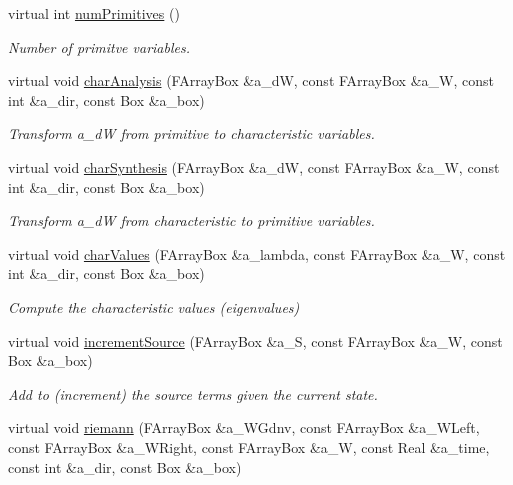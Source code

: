 \begin{DoxyCompactItemize}
virtual int \hyperlink{class_advection_physics_ad00c2d52ec684668ff5cd1da9eed42bf}{num\-Primitives} ()
\begin{DoxyCompactList}\small\item\em Number of primitve variables. \end{DoxyCompactList}\item 
virtual void \hyperlink{class_advection_physics_a63895f9dd1173d14684c0681653c8d36}{char\-Analysis} (F\-Array\-Box \&a\-\_\-d\-W, const F\-Array\-Box \&a\-\_\-\-W, const int \&a\-\_\-dir, const Box \&a\-\_\-box)
\begin{DoxyCompactList}\small\item\em Transform a\-\_\-d\-W from primitive to characteristic variables. \end{DoxyCompactList}\item 
virtual void \hyperlink{class_advection_physics_a8b1269b718057fe2a5d0bc8bdd183d0b}{char\-Synthesis} (F\-Array\-Box \&a\-\_\-d\-W, const F\-Array\-Box \&a\-\_\-\-W, const int \&a\-\_\-dir, const Box \&a\-\_\-box)
\begin{DoxyCompactList}\small\item\em Transform a\-\_\-d\-W from characteristic to primitive variables. \end{DoxyCompactList}\item 
virtual void \hyperlink{class_advection_physics_ac3c19f3db60ae92b995ff3d0cdc3f8dc}{char\-Values} (F\-Array\-Box \&a\-\_\-lambda, const F\-Array\-Box \&a\-\_\-\-W, const int \&a\-\_\-dir, const Box \&a\-\_\-box)
\begin{DoxyCompactList}\small\item\em Compute the characteristic values (eigenvalues) \end{DoxyCompactList}\item 
virtual void \hyperlink{class_advection_physics_a4fdd807a85bd6a9d1542a4d1745a4bf7}{increment\-Source} (F\-Array\-Box \&a\-\_\-\-S, const F\-Array\-Box \&a\-\_\-\-W, const Box \&a\-\_\-box)
\begin{DoxyCompactList}\small\item\em Add to (increment) the source terms given the current state. \end{DoxyCompactList}\item 
virtual void \hyperlink{class_advection_physics_aae156d1179d03c93022e39c9a378c120}{riemann} (F\-Array\-Box \&a\-\_\-\-W\-Gdnv, const F\-Array\-Box \&a\-\_\-\-W\-Left, const F\-Array\-Box \&a\-\_\-\-W\-Right, const F\-Array\-Box \&a\-\_\-\-W, const Real \&a\-\_\-time, const int \&a\-\_\-dir, const Box \&a\-\_\-box)

\end{DoxyCompactItemize}
